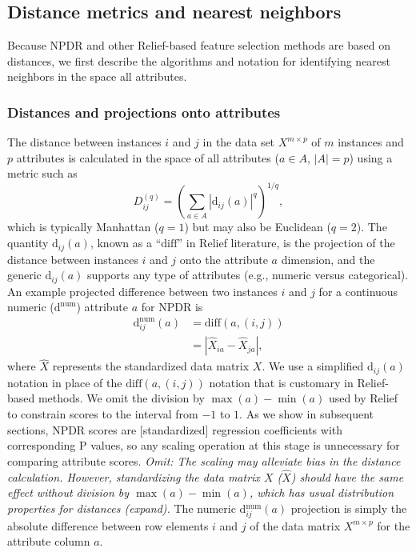 \documentclass[10pt]{article}
\begin{document}
\subsection{Distance metrics and nearest neighbors}\label{sec:reform}
Because NPDR and other Relief-based feature selection methods are based on distances, we first describe the algorithms and notation for identifying nearest neighbors in the space all attributes. 

\subsubsection{Distances and projections onto attributes}
The distance between instances $i$ and $j$ in the data set $X^{m \times p}$ of $m$ instances and $p$ attributes is calculated in the space of all attributes ($a \in A$, $|A|=p$) using a metric such as
\begin{equation}\label{eq:D}
D^{(q)}_{ij}=\left(\sum_{a\in A}|\text{d}_{ij}(a)|^q\right)^{1/q},
\end{equation}
which is typically Manhattan ($q=1$) but may also be Euclidean ($q=2$). The quantity 
$\text{d}_{ij}(a)$,
known as a ``$\text{diff}$'' in Relief literature, is the projection of the distance between instances $i$ and $j$ onto the attribute $a$ dimension, and the 
generic $\text{d}_{ij}(a)$ supports any type of attributes
(e.g., numeric versus categorical).
An example projected difference between two instances $i$ and $j$ for a continuous numeric ($\text{d}^{\text{num}}$) attribute $a$ for NPDR is
\begin{equation}\label{eq:diff}
\begin{aligned}
\text{d}^{\text{num}}_{ij}(a)&=\text{diff}(a,(i,j))\\
                                            & = {|\hat{X}_{ia}-\hat{X}_{ja}|},
 \end{aligned}
\end{equation}
where $\hat{X}$ represents the standardized data matrix $X$.
We use a simplified d$_{ij}(a)$ notation in place of the $\text{diff}(a,(i,j))$ notation that is customary in Relief-based methods.
We omit the division by $\max(a)-\min(a)$ used by Relief to constrain scores to the interval from $-1$ to $1$.
As we show in subsequent sections, NPDR scores are [standardized] regression coefficients with corresponding P values, so any scaling operation at this stage is unnecessary for comparing attribute scores. 
\emph{Omit: The scaling may alleviate bias in the distance calculation. However, standardizing the data matrix $X$ ($\hat{X}$) should have the same effect without division by $\max(a)-\min(a)$, which has usual distribution properties for distances (expand).}
The numeric d$^{\text{num}}_{ij}(a)$ projection is simply the absolute difference between row elements $i$ and $j$ of the data matrix $X^{m \times p}$ for the attribute column $a$. 
\end{document}
